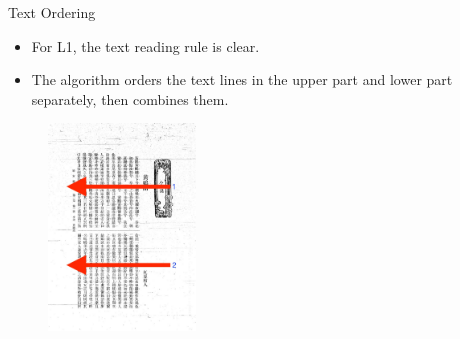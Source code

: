 \documentclass{beamer}
\begin{document}
\begin{frame}
    \begin{center}
        \Large{Text Ordering}
    \end{center}
    \begin{itemize}
        \item For L1, the text reading rule is clear.
        \item The algorithm orders the text lines in the upper part and lower part separately, then combines them.
    \end{itemize}
    \begin{figure}
        \centering
        \includegraphics[width=0.35\textwidth]{figures/fnzz2_order.jpeg}
    \end{figure}
\end{frame}
\end{document}
